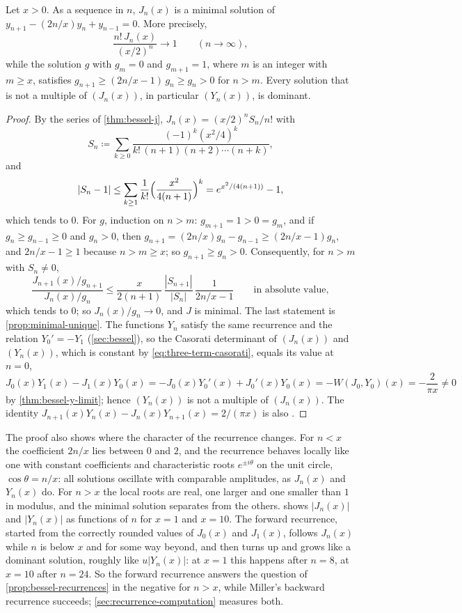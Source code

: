 \begin{proposition}
\label{prop:bessel-minimal}
Let $x>0$. As a sequence in $n$, $J_n(x)$ is a minimal solution of $y_{n+1}-(2n/x)y_n+y_{n-1}=0$. More precisely,
\[
\frac{n!\,J_n(x)}{(x/2)^n}\to1\qquad(n\to\infty),
\]
while the solution $g$ with $g_m=0$ and $g_{m+1}=1$, where $m$ is an integer with $m\ge x$, satisfies $g_{n+1}\ge(2n/x-1)\,g_n\ge g_n>0$ for $n>m$. Every solution that is not a multiple of $(J_n(x))$, in particular $(Y_n(x))$, is dominant.
\end{proposition}

\begin{proof}
By the series of \cref{thm:bessel-j}, $J_n(x)=(x/2)^nS_n/n!$ with
\[
S_n\coloneqq\sum_{k\ge0}\frac{(-1)^k(x^2/4)^k}{k!\,(n+1)(n+2)\cdots(n+k)},
\]
and
\[
|S_n-1|\le\sum_{k\ge1}\frac1{k!}\Bigl(\frac{x^2}{4(n+1)}\Bigr)^k=e^{x^2/(4(n+1))}-1 ,
\]
which tends to $0$. For $g$, induction on $n>m$: $g_{m+1}=1>0=g_m$, and if $g_n\ge g_{n-1}\ge0$ and $g_n>0$, then $g_{n+1}=(2n/x)g_n-g_{n-1}\ge(2n/x-1)g_n$, and $2n/x-1\ge1$ because $n>m\ge x$; so $g_{n+1}\ge g_n>0$. Consequently, for $n>m$ with $S_n\ne0$,
\[
\frac{J_{n+1}(x)/g_{n+1}}{J_n(x)/g_n}\le\frac{x}{2(n+1)}\,\frac{|S_{n+1}|}{|S_n|}\,\frac1{2n/x-1}\qquad\text{in absolute value},
\]
which tends to $0$; so $J_n(x)/g_n\to0$, and $J$ is minimal. The last statement is \cref{prop:minimal-unique}. The functions $Y_n$ satisfy the same recurrence and the relation $Y_0'=-Y_1$ (\cref{sec:bessel}), so the Casorati determinant of $(J_n(x))$ and $(Y_n(x))$, which is constant by \eqref{eq:three-term-casorati}, equals its value at $n=0$,
\[
J_0(x)Y_1(x)-J_1(x)Y_0(x)=-J_0(x)Y_0'(x)+J_0'(x)Y_0(x)=-W(J_0,Y_0)(x)=-\frac2{\pi x}\ne0
\]
by \cref{thm:bessel-y-limit}; hence $(Y_n(x))$ is not a multiple of $(J_n(x))$. The identity $J_{n+1}(x)Y_n(x)-J_n(x)Y_{n+1}(x)=2/(\pi x)$ is also \cite[Eq.~10.5.2]{olver2010nist}.
\end{proof}

The proof also shows where the character of the recurrence changes. For $n<x$ the coefficient $2n/x$ lies between $0$ and $2$, and the recurrence behaves locally like one with constant coefficients and characteristic roots $e^{\pm i\theta}$ on the unit circle, $\cos\theta=n/x$: all solutions oscillate with comparable amplitudes, as $J_n(x)$ and $Y_n(x)$ do. For $n>x$ the local roots are real, one larger and one smaller than $1$ in modulus, and the minimal solution separates from the others.  shows $|J_n(x)|$ and $|Y_n(x)|$ as functions of $n$ for $x=1$ and $x=10$. The forward recurrence, started from the correctly rounded values of $J_0(x)$ and $J_1(x)$, follows $J_n(x)$ while $n$ is below $x$ and for some way beyond, and then turns up and grows like a dominant solution, roughly like $u|Y_n(x)|$: at $x=1$ this happens after $n=8$, at $x=10$ after $n=24$. So the forward recurrence answers the question of \cref{prop:bessel-recurrences} in the negative for $n>x$, while Miller's backward recurrence succeeds; \cref{sec:recurrence-computation} measures both.

